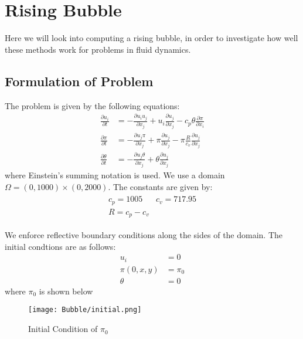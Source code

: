\section{Rising Bubble}

Here we will look into computing a rising bubble, in order to investigate how well these methods work for problems in fluid dynamics.
\subsection{Formulation of Problem}
The problem is given by the following equations\cite{Bryan2002}:
\begin{align*}
    \frac{\partial u_i}{\partial t} &= -\frac{\partial u_i u_j}{\partial x_j} + u_i\frac{\partial u_j}{\partial x_j} - c_p \theta \frac{\partial \pi}{\partial x_i} \\
    \frac{\partial \pi}{\partial t} &= -\frac{\partial u_j \pi}{\partial x_j} + \pi\frac{\partial u_j}{\partial x_j} - \pi \frac{R}{c_v}\frac{\partial u_j}{\partial x_j} \\
    \frac{\partial \theta}{\partial t} &= -\frac{\partial u_j \theta}{\partial x_j} + \theta\frac{\partial u_j}{\partial x_j}
\end{align*}
where Einstein's summing notation is used.
We use a domain $\Omega = (0,1000) \times (0,2000)$.
The constants are given by:
\begin{align*}
    \begin{matrix}
    c_p = 1005 & c_v = 717.95 \\
    R = c_p - c_v 
    \end{matrix}
\end{align*}

We enforce reflective boundary conditions along the sides of the domain.
The initial condtions are as follows:
\begin{align*}
    u_i &= 0\\
    \pi(0,x,y) &= \pi_0\\
    \theta &= 0
\end{align*}
where $\pi_0$ is shown below
\begin{figure}[H]
    \centering
    \begin{minipage}{1\textwidth}
        \texttt{[image: Bubble/initial.png]} %
        \caption{Initial Condition of $\pi_0$}
        \label{fig:first order 8 0.5}
    \end{minipage}
\end{figure}
